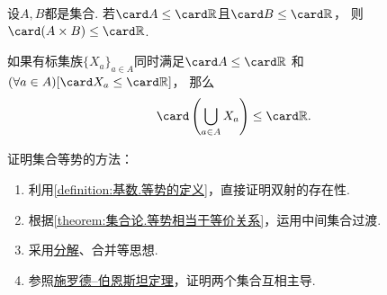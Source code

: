 \begin{proposition}
设\(A,B\)都是集合.
若\(\card A \leq \card\mathbb{R}\)且\(\card B \leq \card\mathbb{R}\)，
则\(\card(A \times B) \leq \card\mathbb{R}\).
\end{proposition}

\begin{proposition}
如果有标集族\(\{X_a\}_{a \in A}\)同时满足\(
	\card A \leq \card\mathbb{R}
\)
和\(
	(\forall a \in A)
	[\card X_a \leq \card\mathbb{R}]
\)，
那么\begin{equation*}
	\card\left( \bigcup_{a \in A} X_a \right) \leq \card\mathbb{R}.
\end{equation*}
\end{proposition}

证明集合等势的方法：\begin{enumerate}
	\item 利用\cref{definition:基数.等势的定义}，直接证明双射的存在性.
	\item 根据\cref{theorem:集合论.等势相当于等价关系}，运用中间集合过渡.
	\item 采用\hyperref[theorem:基数.集合在映射下的分解]{分解}、合并等思想.
	\item 参照\hyperref[theorem:集合论.施罗德--伯恩斯坦定理]{施罗德--伯恩斯坦定理}，证明两个集合互相主导.
\end{enumerate}
